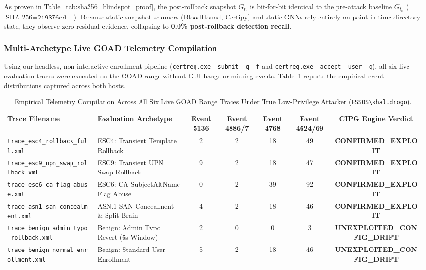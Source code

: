 As proven in Table~\ref{tab:sha256_blindspot_proof}, the post-rollback snapshot $G_{t_3}$ is bit-for-bit identical to the pre-attack baseline $G_{t_0}$ ($\text{SHA-256} = \texttt{219376ed...}$). Because static snapshot scanners (BloodHound, Certipy) and static GNNs rely entirely on point-in-time directory state, they observe zero residual evidence, collapsing to \textbf{0.0\% post-rollback detection recall}.

\subsubsection{Multi-Archetype Live GOAD Telemetry Compilation}
\label{sec:live_telemetry_compilation}
Using our headless, non-interactive enrollment pipeline (\texttt{certreq.exe -submit -q -f} and \texttt{certreq.exe -accept -user -q}), all six live evaluation traces were executed on the GOAD range without GUI hangs or missing events. Table~\ref{tab:live_goad_traces} reports the empirical event distributions captured across both hosts.

\begin{table}[htbp]
\centering
\small
\caption{Empirical Telemetry Compilation Across All Six Live GOAD Range Traces Under True Low-Privilege Attacker (\texttt{ESSOS\textbackslash khal.drogo}).}
\label{tab:live_goad_traces}
\begin{tabularx}{\textwidth}{lXccccc}
\toprule
\textbf{Trace Filename} & \textbf{Evaluation Archetype} & \textbf{Event 5136} & \textbf{Event 4886/7} & \textbf{Event 4768} & \textbf{Event 4624/69} & \textbf{CIPG Engine Verdict} \\
\midrule
\texttt{trace\_esc4\_rollback\_full.xml} & ESC4: Transient Template Rollback & 2 & 2 & 18 & 49 & \textbf{CONFIRMED\_EXPLOIT} \\
\texttt{trace\_esc9\_upn\_swap\_rollback.xml} & ESC9: Transient UPN Swap Rollback & 9 & 2 & 18 & 47 & \textbf{CONFIRMED\_EXPLOIT} \\
\texttt{trace\_esc6\_ca\_flag\_abuse.xml} & ESC6: CA SubjectAltName Flag Abuse & 0 & 2 & 39 & 92 & \textbf{CONFIRMED\_EXPLOIT} \\
\texttt{trace\_asn1\_san\_concealment.xml} & ASN.1 SAN Concealment \& Split-Brain & 4 & 2 & 18 & 46 & \textbf{CONFIRMED\_EXPLOIT} \\
\texttt{trace\_benign\_admin\_typo\_rollback.xml} & Benign: Admin Typo Revert (6s Window) & 2 & 0 & 0 & 3 & \textbf{UNEXPLOITED\_CONFIG\_DRIFT} \\
\texttt{trace\_benign\_normal\_enrollment.xml} & Benign: Standard User Enrollment & 5 & 2 & 18 & 46 & \textbf{UNEXPLOITED\_CONFIG\_DRIFT} \\
\bottomrule
\end{tabularx}
\end{table}

